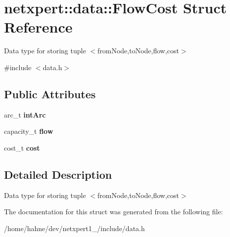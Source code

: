 \hypertarget{structnetxpert_1_1data_1_1FlowCost}{}\section{netxpert\+:\+:data\+:\+:Flow\+Cost Struct Reference}
\label{structnetxpert_1_1data_1_1FlowCost}


Data type for storing tuple $<$from\+Node,to\+Node,flow,cost$>$  




{\ttfamily \#include $<$data.\+h$>$}

\subsection*{Public Attributes}
\begin{DoxyCompactItemize}
\item 
arc\+\_\+t {\bfseries int\+Arc}\hypertarget{structnetxpert_1_1data_1_1FlowCost_a51a06cd2018eebbb38eccc2de816c7aa}{}\label{structnetxpert_1_1data_1_1FlowCost_a51a06cd2018eebbb38eccc2de816c7aa}

\item 
capacity\+\_\+t {\bfseries flow}\hypertarget{structnetxpert_1_1data_1_1FlowCost_ad162527ddd7887b64b1cd2c1a3c5194c}{}\label{structnetxpert_1_1data_1_1FlowCost_ad162527ddd7887b64b1cd2c1a3c5194c}

\item 
cost\+\_\+t {\bfseries cost}\hypertarget{structnetxpert_1_1data_1_1FlowCost_a098fccc5cac184b83536f1490efd5716}{}\label{structnetxpert_1_1data_1_1FlowCost_a098fccc5cac184b83536f1490efd5716}

\end{DoxyCompactItemize}


\subsection{Detailed Description}
Data type for storing tuple $<$from\+Node,to\+Node,flow,cost$>$ 

The documentation for this struct was generated from the following file\+:\begin{DoxyCompactItemize}
\item 
/home/hahne/dev/netxpert1\+\_/include/data.\+h\end{DoxyCompactItemize}
